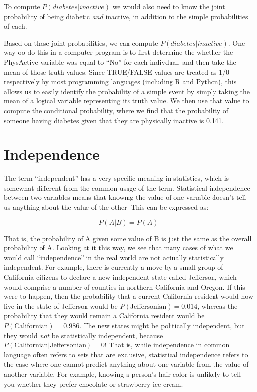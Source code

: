 \documentclass[12pt,]{book}
\theoremstyle{definition}
\theoremstyle{definition}
\theoremstyle{definition}
\theoremstyle{remark}
\begin{document}
To compute \(P(diabetes|inactive)\) we would also need to know the joint probability of being diabetic \emph{and} inactive, in addition to the simple probabilities of each.

Based on these joint probabilities, we can compute \(P(diabetes|inactive)\). One way oo do this in a computer program is to first determine the whether the PhysActive variable was equal to ``No'' for each indivdual, and then take the mean of those truth values. Since TRUE/FALSE values are treated as 1/0 respectively by most programming languages (including R and Python), this allows us to easily identify the probability of a simple event by simply taking the mean of a logical variable representing its truth value. We then use that value to compute the conditional probability, where we find that the probability of someone having diabetes given that they are physically inactive is 0.141.

\hypertarget{independence}{%
\section{Independence}\label{independence}}

The term ``independent'' has a very specific meaning in statistics, which is somewhat different from the common usage of the term. Statistical independence between two variables means that knowing the value of one variable doesn't tell us anything about the value of the other. This can be expressed as:

\[
P(A|B) = P(A)
\]

That is, the probability of A given some value of B is just the same as the overall probability of A. Looking at it this way, we see that many cases of what we would call ``independence'' in the real world are not actually statistically independent. For example, there is currently a move by a small group of California citizens to declare a new independent state called Jefferson, which would comprise a number of counties in northern California and Oregon. If this were to happen, then the probability that a current California resident would now live in the state of Jefferson would be \(P(\text{Jeffersonian})=0.014\), whereas the probability that they would remain a California resident would be \(P(\text{Californian})=0.986\). The new states might be politically independent, but they would \emph{not} be statistically independent, because \(P(\text{Californian|Jeffersonian}) = 0\)! That is, while independence in common language often refers to sets that are exclusive, statistical independence refers to the case where one cannot predict anything about one variable from the value of another variable. For example, knowing a person's hair color is unlikely to tell you whether they prefer chocolate or strawberry ice cream.
\end{document}
